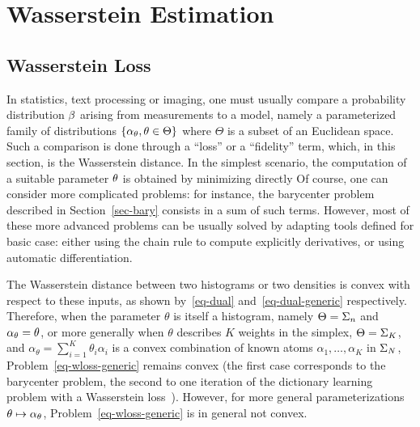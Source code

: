 

\section{Wasserstein Estimation}


\subsection{Wasserstein Loss}

In statistics, text processing or imaging, one must usually compare a probability distribution $\beta$ arising from measurements to a model, namely a parameterized family of distributions $\{\alpha_\theta,\theta\in\Theta\}$ where $\Theta$ is a subset of an Euclidean space. Such a comparison is done through a ``loss'' or a ``fidelity'' term, which, in this section, is the Wasserstein distance. 
%
In the simplest scenario, the computation of a suitable parameter $\theta$ is obtained by minimizing directly
Of course, one can consider more complicated problems: for instance, the barycenter problem described in Section~\ref{sec-bary} consists in a sum of such terms. However, most of these more advanced problems can be usually solved by adapting tools defined for basic case: either using the chain rule to compute explicitly derivatives, or using automatic differentiation. %

The Wasserstein distance between two histograms or two densities is convex with respect to these inputs, as shown by~\eqref{eq-dual} and~\eqref{eq-dual-generic} respectively. Therefore, when the parameter $\theta$ is itself a histogram, namely $\Theta=\Sigma_n$ and $\alpha_\theta=\theta$, or more generally when $\theta$ describes $K$ weights in the simplex, $\Theta=\Sigma_K$, and $\alpha_\theta=\sum_{i=1}^K \theta_i \alpha_i$ is a convex combination of known atoms $\alpha_1,\dots,\alpha_K$ in $\Sigma_N$, Problem~\eqref{eq-wloss-generic} remains convex (the first case corresponds to the barycenter problem, the second to one iteration of the dictionary learning problem with a Wasserstein loss~\cite{pmlr-v51-rolet16}). However, for more general parameterizations $\theta\mapsto \alpha_\theta$, Problem~\eqref{eq-wloss-generic} is in general not convex. 


